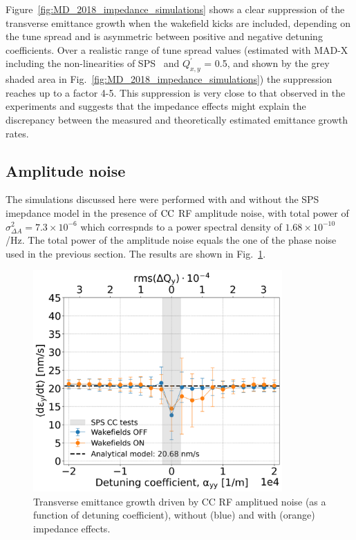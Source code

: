Figure~\ref{fig:MD_2018_impedance_simulations} shows a clear suppression of the transverse emittance growth when the wakefield kicks are included, depending on the tune spread and is asymmetric between positive and negative detuning coefficients. Over a realistic range of tune spread values (estimated with MAD-X~\cite{madx} including the non-linearities of SPS~\cite{Carlà:2664976, Alekou:2640326} and $Q^\prime_{x,y}$ = 0.5, and shown by the grey shaded area in Fig.~\ref{fig:MD_2018_impedance_simulations}) the suppression reaches up to a factor 4-5. This suppression is very close to that observed in the experiments and suggests that the impedance effects might explain the discrepancy between the measured and theoretically estimated emittance growth rates.


\subsection{Amplitude noise}\label{subsec:amplitude_noise}
The simulations discussed here were performed with and without the SPS imepdance model in the presence of ${\mathrm{CC}}$ RF amplitude noise, with total power of $\sigma_{\Delta A}^2=7.3\times 10^{-6}$ which correspnds to a power spectral density of $1.68 \times 10^{-10}$/Hz. The total power of the amplitude noise equals the one of the phase noise used in the previous section. The results are shown in Fig.~\ref{fig:study_1_2018_paramters_AN}.

\begin{figure}[!h] %
    \centering         
    \includegraphics[width=0.85\textwidth]{images/Ch7/deyRates_final_2018_AN_sps_270GeV_AN1e-8_400MHz_y-plane_QpxQpy5e-1_6D_Nb5e5_intensity3e10_ayyScan_wakesON_vs_OFF_vs_TuneSpreadvsExpectedSPS.png}
        \caption{Transverse emittance growth driven by CC RF amplitued noise (as a function of detuning coefficient), without (blue) and with (orange) impedance effects.}
        \label{fig:study_1_2018_paramters_AN}
 \end{figure}


